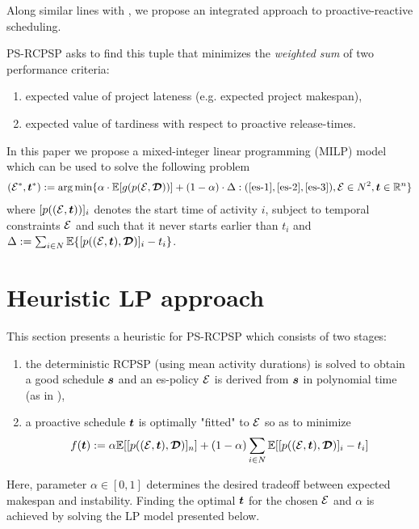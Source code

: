 	Along similar lines with \cite{deblaere2011proactive}, 
	we propose an integrated approach to proactive-reactive scheduling.
	
	PS-RCPSP asks to find this tuple that minimizes 
	the \emph{weighted sum} of two performance criteria:
	\begin{enumerate}
		\item expected value of project lateness (e.g. expected project makespan),
		\item expected value of tardiness with respect to proactive release-times.
	\end{enumerate}
	In this paper we propose a mixed-integer linear programming (MILP)
	model which can be used to solve the following problem
  	\begin{align}
 		(\mathcal{E}^*,\boldsymbol{t}^*) := \arg \min \{\alpha \cdot \mathbb{E}[g(p(\mathcal{E},\boldsymbol{\mathcal{D}}))] 
 									+ (1-\alpha) \cdot \Delta
 			: (\ref{es-1},\ref{es-2},\ref{es-3}), \mathcal{E} \in N^2, \boldsymbol{t} \in \mathbb{R}^n \}
 		\label{eq-pr-rcpsp}
 	\end{align}
 	where $[p((\mathcal{E},\boldsymbol{t}))]_i$ denotes the start time of activity $i$,
 	subject to temporal constraints $\mathcal{E}$ and such that it never starts earlier than $t_i$
 	and $\Delta := \sum_{i \in N}\mathbb{E}\{[p((\mathcal{E},\boldsymbol{t}),\boldsymbol{\mathcal{D}})]_i-t_i\}$.
 	
 	\section{Heuristic LP approach}
 	\label{sec-lp}
 	
 	This section presents a heuristic for PS-RCPSP which consists of two stages:
 	\begin{enumerate}
 		\item
 		the deterministic RCPSP (using mean activity durations) is solved to obtain a good schedule $\boldsymbol{s}$ and
 		an es-policy $\mathcal{E}$ is derived from $\boldsymbol{s}$ in polynomial time (as in \cite{artigues2003insertion}),
 		
 		\item
 		a proactive schedule $\boldsymbol{t}$ is optimally "fitted" to $\mathcal{E}$ so as to minimize 
 		\[
 			f(\boldsymbol{t}) := \alpha \mathbb{E}[ [p((\mathcal{E},\boldsymbol{t}),\boldsymbol{\mathcal{D}})]_n ] + 
 			(1-\alpha) \sum_{i \in N} \mathbb{E}[ [p((\mathcal{E},\boldsymbol{t}),\boldsymbol{\mathcal{D}})]_i - t_i ]
 		\]
 	\end{enumerate}
  	Here, parameter $\alpha \in [0,1]$ determines the desired tradeoff between expected makespan and instability. 
 	Finding the optimal $\boldsymbol{t}$ for the chosen $\mathcal{E}$ and $\alpha$ is achieved by solving the LP model presented below.	
 	
